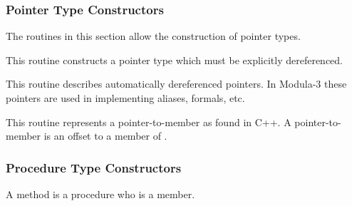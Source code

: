 \subsubsection{Pointer Type Constructors}
The routines in this section allow the construction of pointer types.

\begin{functionality}
This routine constructs a pointer type which must be explicitly dereferenced.
\end{functionality}

\begin{functionality}
This routine describes automatically dereferenced pointers.  In
Modula-3 these pointers are used in implementing  aliases,
 formals, etc.  
\end{functionality}
	
\begin{functionality}
This routine represents a pointer-to-member as found in C++.  A
pointer-to-member is an offset to a member of .  
\end{functionality}
	
\subsubsection{Procedure Type Constructors}
A method is a procedure who is a member.

\begin{functionality}
\end{functionality}

